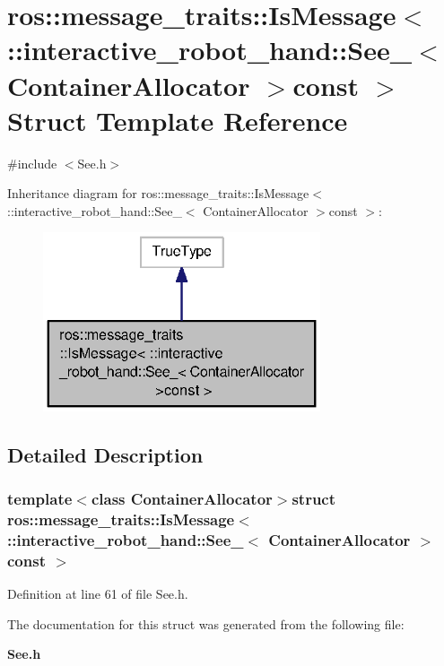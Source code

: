 \section{ros\-:\-:message\-\_\-traits\-:\-:Is\-Message$<$ \-:\-:interactive\-\_\-robot\-\_\-hand\-:\-:See\-\_\-$<$ Container\-Allocator $>$const $>$ Struct Template Reference}
\label{structros_1_1message__traits_1_1IsMessage_3_01_1_1interactive__robot__hand_1_1See___3_01ContainerAllocator_01_4const_01_01_4}


{\ttfamily \#include $<$See.\-h$>$}



Inheritance diagram for ros\-:\-:message\-\_\-traits\-:\-:Is\-Message$<$ \-:\-:interactive\-\_\-robot\-\_\-hand\-:\-:See\-\_\-$<$ Container\-Allocator $>$const $>$\-:
\nopagebreak
\begin{figure}[H]
\begin{center}
\leavevmode
\includegraphics[width=232pt]{structros_1_1message__traits_1_1IsMessage_3_01_1_1interactive__robot__hand_1_1See___3_01Containeb62e1d89e19963e929cdeeadcb5e9fd2}
\end{center}
\end{figure}


\subsection{Detailed Description}
\subsubsection*{template$<$class Container\-Allocator$>$struct ros\-::message\-\_\-traits\-::\-Is\-Message$<$ \-::interactive\-\_\-robot\-\_\-hand\-::\-See\-\_\-$<$ Container\-Allocator $>$const  $>$}



Definition at line 61 of file See.\-h.



The documentation for this struct was generated from the following file\-:\begin{DoxyCompactItemize}
\item 
{\bf See.\-h}\end{DoxyCompactItemize}
